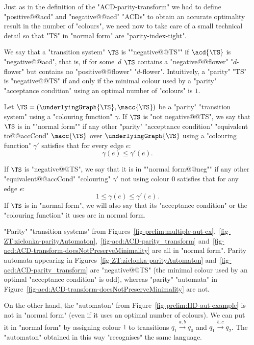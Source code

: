 \documentclass[10pt,a4paper]{amsart}
\renewcommand{\gg}{\gamma}
\newcommand{\re}[1]{\xrightarrow{#1}}
\begin{document}
Just as in the definition of the "ACD-parity-transform" we had to define "positive@@acd" and "negative@@acd" "ACDs" to obtain an accurate optimality result in the number of "colours", we need now to take care of a small technical detail so that "TS" in "normal form" are "parity-index-tight".

\AP We say that a "transition system" $\TS$ is ""negative@@TS"" if $\acd{\TS}$ is "negative@@acd", that is, if for some~$d$ $\TS$ contains a "negative@@flower" "$d$-flower" but contains no "positive@@flower" "$d$-flower". Intuitively, a "parity" "TS" is "negative@@TS" if and only if the minimal colour used by a "parity" "acceptance condition" using an optimal number of "colours" is $1$.


\begin{definition}\label{def-normF:normal_form_parity}
	\AP Let $\TS = (\underlyingGraph{\TS}, \macc{\TS})$ be a "parity" "transition system" using a "colouring function" $\gg$. If $\TS$ is "not negative@@TS", we say that $\TS$ is in ""normal form"" if any other "parity" "acceptance condition" "equivalent to@@accCond" $\macc{\TS}$ over $\underlyingGraph{\TS}$ using a "colouring function" $\gg'$ satisfies that for every edge $e$:
	\[ \gg(e)\leq \gg'(e).  \]
	
	If $\TS$ is "negative@@TS", we say that it is in ""normal form@@neg"" if any other "equivalent@@accCond"  "colouring" $\gg'$ not using colour $0$ satisfies that for any edge $e$:
	\[  1\leq\gg(e)\leq \gg'(e).  \]
	If $\TS$ is in "normal form", we will also say that its "acceptance condition" or the "colouring function" it uses are in normal form.
\end{definition}


\begin{example}\label{ex-cor:normal-form}
	"Parity" "transition systems" from Figures~\ref{fig-prelim:multiple-aut-ex},~\ref{fig-ZT:zielonka-parityAutomaton},~\ref{fig-acd:ACD-parity_transform} and~\ref{fig-acd:ACD-transform-doesNotPreserveMinimality} are all in "normal form". Parity automata appearing in Figures~\ref{fig-ZT:zielonka-parityAutomaton} and~\ref{fig-acd:ACD-parity_transform} are "negative@@TS" (the minimal colour used by an optimal "acceptance condition" is odd), whereas "parity" "automata" in Figure~\ref{fig-acd:ACD-transform-doesNotPreserveMinimality} are not.
	
	On the other hand, the "automaton" from Figure~\ref{fig-prelim:HD-aut-example} is not in "normal form" (even if it uses an optimal number of colours). We can put it in "normal form" by assigning colour $1$ to transitions $q_1\re{a,b}q_0$ and $q_1\re{b,c}q_2$. The "automaton" obtained in this way "recognises" the same language.
\end{example}
\end{document}

